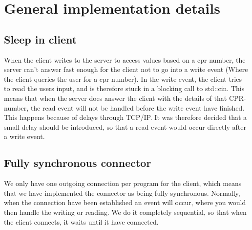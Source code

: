 \documentclass[Main]{subfiles}
\begin{document}
\section{General implementation details}\label{sec:generalImpDetails}
\subsection*{Sleep in client}
When the client writes to the server to access values based on a cpr number, the server can't answer fast enough for the client not to go into a write event (Where the client queries the user for a cpr number). In the write event, the client tries to read the users input, and is therefore stuck in a blocking call to std::cin. This means that when the server does answer the client with the details of that CPR-number, the read event will not be handled before the write event have finished. This happens because of delays through TCP/IP. It was therefore decided that a small delay should be introduced, so that a read event would occur directly after a write event.

\subsection*{Fully synchronous connector}
We only have one outgoing connection per program for the client, which means that we have implemented the connector as being fully synchronous. Normally, when the connection have been established an event will occur, where you would then handle the writing or reading. We do it completely sequential, so that when the client connects, it waits until it have connected.
\end{document}
